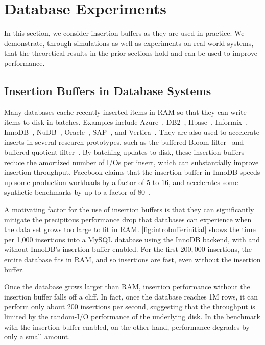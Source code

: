 \section{Database Experiments}\label{sec:br-experiments}
In this section, we consider insertion buffers as they are used in practice. We
demonstrate, through simulations as well as experiments on real-world systems,
that the theoretical results in the prior sections hold and can be used to
improve performance.

\subsection{Insertion Buffers in Database Systems}
Many databases cache recently inserted items in RAM so that they can write
items to disk in batches.  Examples include
Azure~\cite{Azure16}, 
DB2~\cite{IBM17},  
Hbase~\cite{Xiang12}, 
Informix~\cite{Informix}, 
InnoDB~\cite{Callaghan11},  
NuDB~\cite{NuDB16},  
Oracle~\cite{Oracle17},  
SAP~\cite{SAP17},  and 
Vertica~\cite{Vertica17}.
They are also used to accelerate inserts in several research prototypes, such
as the buffered Bloom
filter~\cite{DBLP:conf/vldb/CanimMBLR10} and buffered quotient
filter~\cite{DBLP:journals/pvldb/BenderFJKKMMSSZ12}.  
By batching updates to disk, these insertion buffers reduce the amortized
number of I/Os per insert, which can substantially improve insertion
throughput.  Facebook claims that the insertion buffer in InnoDB speeds up some
production workloads by a factor of $5$ to $16$, and accelerates some synthetic
benchmarks by up to a factor of $80$~\cite{Callaghan11}.

A motivating factor for the use of insertion buffers is that they can
significantly mitigate the precipitous performance drop that databases can
experience when the data set grows too large to fit in RAM.
\cref{fig:introbufferinitial} shows the time per 1,000 insertions into a MySQL
database using the InnoDB backend, with and without InnoDB's insertion buffer
enabled.  For the first $200,000$ insertions, the entire database fits in RAM,
and so insertions are fast, even without the insertion buffer.

Once the database grows larger than RAM, insertion performance without the
insertion buffer falls off a cliff.  In fact, once the database reaches 1M
rows, it can perform only about 200 insertions per second, suggesting that the
throughput is limited by the random-I/O performance of the underlying disk.  In
the benchmark with the insertion buffer enabled, on the other hand, performance
degrades by only a small amount.

